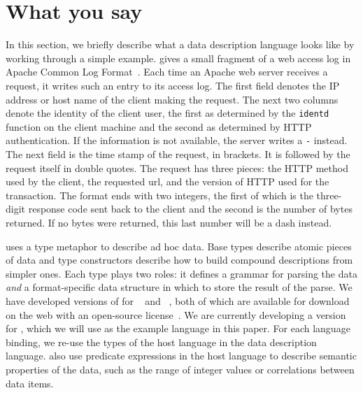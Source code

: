\documentclass{sig-alternate}
\begin{document}
\section{What you say}
\label{sec:language}



In this section, we briefly describe what a \pads{} data description
language looks like by working through a simple example.
 gives a small fragment of a web access log in Apache
Common Log Format~\cite{apacheclf}.  Each time an Apache web server
receives a request, it writes such an entry to its access log.  The
first field denotes the IP address or host name of the client making
the request.  The next two columns denote the identity of the client
user, the first as determined by the \texttt{identd} function on the
client machine and the second as determined by HTTP authentication.
If the information is not available, the server writes a \texttt{-}
instead. The next field is the time stamp of the request, in brackets.
It is followed by the request itself in double quotes. The request has
three pieces: the HTTP method used by the client, the requested url,
and the version of HTTP used for the transaction.  The format ends
with two integers, the first of which is the three-digit response code
sent back to the client and the second is the number of bytes
returned.  If no bytes were returned, this last number will be a dash
instead.  

\pads{} uses a type metaphor to describe ad hoc data.  Base types
describe atomic pieces of data and type constructors describe how to
build compound descriptions from simpler ones.  Each \pads{} type
plays two roles: it defines a grammar for parsing the data
\textit{and} a format-specific data structure in which to store the
result of the parse.  We have developed versions of \pads{} for
\C{}~\cite{fisher+:pads} and \ml{}~\cite{mandelbaum+:pads-ml}, both of
which are available for download on the web with an open-source
license~\cite{padsweb}. We are currently developing a version for
\haskell{}, which we will use as the example language in this paper.
For each language binding, we re-use the types of the host language in
the data description language.  \pads{} also use predicate expressions
in the host language to describe semantic properties of the data, such
as the range of integer values or correlations between data items.
\end{document}
